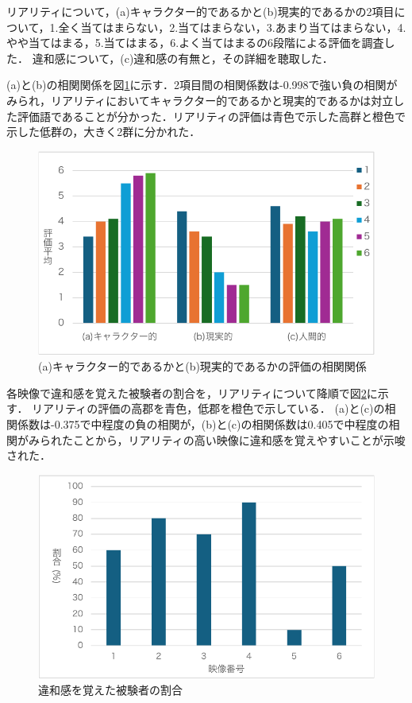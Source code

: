 \documentclass[twocolumn,10pt,a4j]{ltjsarticle}
\begin{document}
  リアリティについて，(a)キャラクター的であるかと(b)現実的であるかの2項目について，1.全く当てはまらない，2.当てはまらない，3.あまり当てはまらない，4.やや当てはまる，5.当てはまる，6.よく当てはまるの6段階による評価を調査した．
  違和感について，(c)違和感の有無と，その詳細を聴取した．
  
  (a)と(b)の相関関係を図\ref{fig1}に示す．2項目間の相関係数は-0.998で強い負の相関がみられ，リアリティにおいてキャラクター的であるかと現実的であるかは対立した評価語であることが分かった．リアリティの評価は青色で示した高群と橙色で示した低群の，大きく2群に分かれた．
   
  \begin{figure}[H]
    \centering
    \includegraphics[width=\linewidth]{fig1.pdf}
    \caption{(a)キャラクター的であるかと(b)現実的であるかの評価の相関関係\label{fig1}}
  \end{figure}

  各映像で違和感を覚えた被験者の割合を，リアリティについて降順で図\ref{fig2}に示す．
  リアリティの評価の高郡を青色，低郡を橙色で示している．
  (a)と(c)の相関係数は-0.375で中程度の負の相関が，(b)と(c)の相関係数は0.405で中程度の相関がみられたことから，リアリティの高い映像に違和感を覚えやすいことが示唆された．
  
  \begin{figure}[H]
    \centering
    \includegraphics[width=\linewidth]{fig2.pdf}
    \caption{違和感を覚えた被験者の割合\label{fig2}}
  \end{figure}
  
\end{document}
